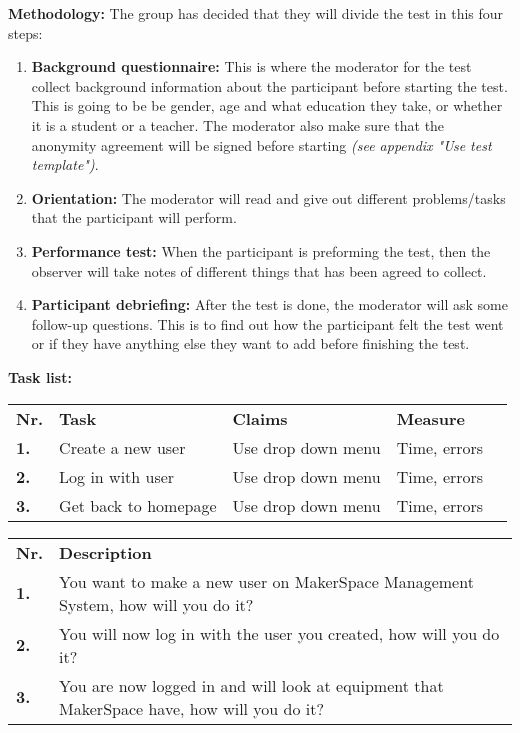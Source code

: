 \textbf{Methodology:} 
The group has decided that they will divide the test in this four steps:
\begin{enumerate}
    \item \textbf{Background questionnaire:} This is where the moderator for the test collect background information about the participant before starting the test. This is going to be be gender, age and what education they take, or whether it is a student or a teacher. The moderator also make sure that the anonymity agreement will be signed before starting \textit{(see appendix "Use test template")}.
    
    \item \textbf{Orientation:} The moderator will read and give out different problems/tasks that the participant will perform.
    
    \item \textbf{Performance test:} When the participant is preforming the test, then the observer will take notes of different things that has been agreed to collect.
    
    \item \textbf{Participant debriefing:} After the test is done, the moderator will ask some follow-up questions. This is to find out how the participant felt the test went or if they have anything else they want to add before finishing the test.
\end{enumerate}
\textbf{Task list:}
\begin{table}[h]


\begin{tabular}{lllll}
 \textbf{Nr.} & \textbf{Task} & \textbf{Claims} & \textbf{
Measure}  \\
\textbf{1.} & Create a new user &  Use drop down menu & Time, errors \\
\textbf{2.} & Log in with user & Use drop down menu & Time, errors  \\
\textbf{3.} & Get back to homepage & Use drop down menu & Time, errors 
\end{tabular}
\end{table}

\begin{table}[]
\begin{tabular}{ll}
\textbf{Nr.} & \textbf{Description} \\
\textbf{1.} & You want to make a new user on MakerSpace Management System, how will you do it? \\
\textbf{2.} & You will now log in with the user you created, how will you do it? \\
\textbf{3.} & You are now logged in and will look at equipment that MakerSpace have, how will you do it? 
\end{tabular}
\end{table} 

